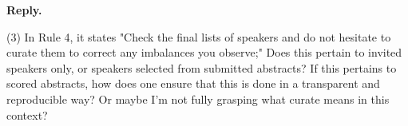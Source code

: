 \documentclass{article}
\newenvironment{Reply}{\noindent\color{BlueViolet}\textbf{Reply.}}{\vspace{1em}}
\begin{document}
\begin{Reply}


\end{Reply}

(3) In Rule 4, it states "Check the final lists of speakers and do not hesitate to curate them to correct any imbalances you observe;" Does this pertain to invited speakers only, or speakers selected from submitted abstracts? If this pertains to scored abstracts, how does one ensure that this is done in a transparent and reproducible way? Or maybe I'm not fully grasping what curate means in this context?
\end{document}
